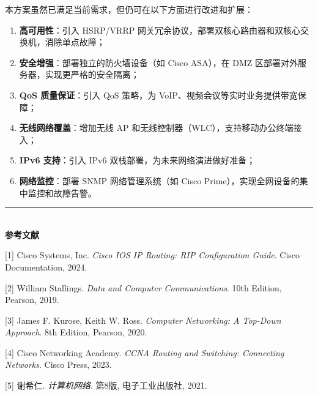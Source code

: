 \documentclass[12pt,a4paper]{ctexart}
\begin{document}
本方案虽然已满足当前需求，但仍可在以下方面进行改进和扩展：

\begin{enumerate}[label=(\arabic*), leftmargin=2em]
    \item \textbf{高可用性}：引入 HSRP/VRRP 网关冗余协议，部署双核心路由器和双核心交换机，消除单点故障；
    \item \textbf{安全增强}：部署独立的防火墙设备（如 Cisco ASA），在 DMZ 区部署对外服务器，实现更严格的安全隔离；
    \item \textbf{QoS 质量保证}：引入 QoS 策略，为 VoIP、视频会议等实时业务提供带宽保障；
    \item \textbf{无线网络覆盖}：增加无线 AP 和无线控制器（WLC），支持移动办公终端接入；
    \item \textbf{IPv6 支持}：引入 IPv6 双栈部署，为未来网络演进做好准备；
    \item \textbf{网络监控}：部署 SNMP 网络管理系统（如 Cisco Prime），实现全网设备的集中监控和故障告警。
\end{enumerate}

\vspace{1cm}

\begin{flushright}
\begin{minipage}{6cm}
\centering
\rule{6cm}{0.4pt}\\[0.3cm]
\textbf{参考文献}

{[1]} Cisco Systems, Inc. \textit{Cisco IOS IP Routing: RIP Configuration Guide}. Cisco Documentation, 2024.

{[2]} William Stallings. \textit{Data and Computer Communications}. 10th Edition, Pearson, 2019.

{[3]} James F. Kurose, Keith W. Ross. \textit{Computer Networking: A Top-Down Approach}. 8th Edition, Pearson, 2020.

{[4]} Cisco Networking Academy. \textit{CCNA Routing and Switching: Connecting Networks}. Cisco Press, 2023.

{[5]} 谢希仁. \textit{计算机网络}. 第8版, 电子工业出版社, 2021.
\end{minipage}
\end{flushright}
\end{document}
